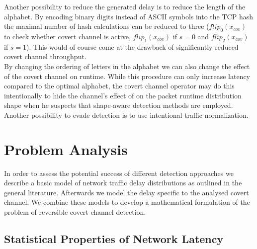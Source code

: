 \documentclass[12pt,a4paper,automark, toc=bib]{scrreprt}
\theoremstyle{definition}
\begin{document}
			Another possibility to reduce the generated delay is to reduce the length of the alphabet. By encoding binary digits instead of ASCII symbols into the TCP hash the maximal number of hash calculations can be reduced to three ($flip_0(x_{cov})$ to check whether covert channel is active, $flip_1(x_{cov})$ if $s=0$ and $flip_2(x_{cov})$ if $s=1$). This would of course come at the drawback of significantly reduced covert channel throughput. \\
			By changing the ordering of letters in the alphabet we can also change the effect of the covert channel on runtime. While this procedure can only increase latency compared to the optimal alphabet, the covert channel operator may do this intentionally to hide the channel's effect of on the packet runtime distribution shape when he suspects that shape-aware detection methods are employed. Another possibility to evade detection is to use intentional traffic normalization.
			
			\label{cc-desc}
			
			
		\section{Problem Analysis}
		
			In order to assess the potential success of different detection approaches we describe a basic model of network traffic delay distributions as outlined in the general literature. Afterwards we model the delay specific to the analysed covert channel. We combine these models to develop a mathematical formulation of the problem of reversible covert channel detection. 
		
			\subsection{Statistical Properties of Network Latency}
			
\end{document}
